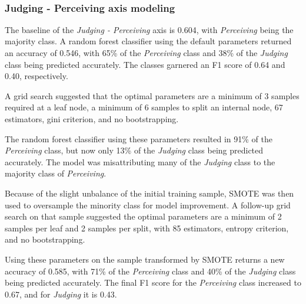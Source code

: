 \documentclass[11pt]{article}
\begin{document}
    \begin{center}
    \end{center}
    { \hspace*{\fill} \\}
    
    \subsubsection{Judging - Perceiving axis
modeling}\label{judging---perceiving-axis-modeling}

    The baseline of the \emph{Judging - Perceiving} axis is 0.604, with
\emph{Perceiving} being the majority class. A random forest classifier
using the default parameters returned an accuracy of 0.546, with 65\% of
the \emph{Perceiving} class and 38\% of the \emph{Judging} class being
predicted accurately. The classes garnered an F1 score of 0.64 and 0.40,
respectively.

A grid search suggested that the optimal parameters are a minimum of 3
samples required at a leaf node, a minimum of 6 samples to split an
internal node, 67 estimators, gini criterion, and no bootstrapping.

The random forest classifier using these parameters resulted in 91\% of
the \emph{Perceiving} class, but now only 13\% of the \emph{Judging}
class being predicted accurately. The model was misattributing many of
the \emph{Judging} class to the majority class of \emph{Perceiving}.

Because of the slight unbalance of the initial training sample, SMOTE
was then used to oversample the minority class for model improvement. A
follow-up grid search on that sample suggested the optimal parameters
are a minimum of 2 samples per leaf and 2 samples per split, with 85
estimators, entropy criterion, and no bootstrapping.

Using these parameters on the sample transformed by SMOTE returns a new
accuracy of 0.585, with 71\% of the \emph{Perceiving} class and 40\% of
the \emph{Judging} class being predicted accurately. The final F1 score
for the \emph{Perceiving} class increased to 0.67, and for
\emph{Judging} it is 0.43.
\end{document}
